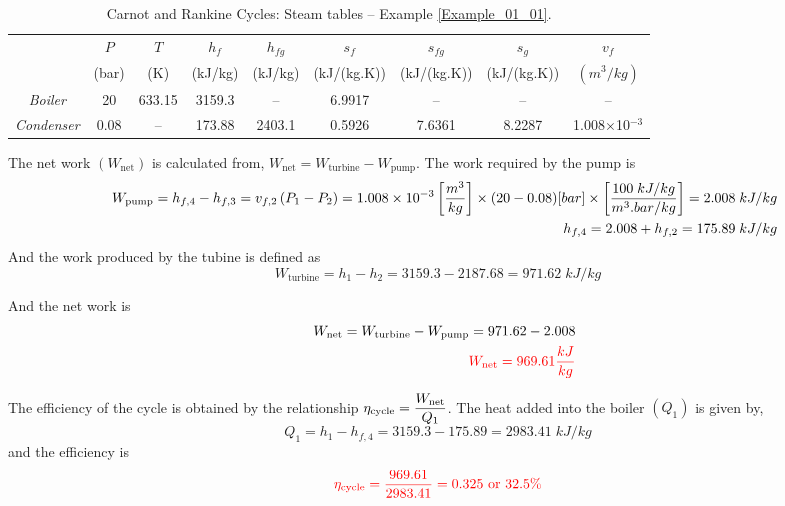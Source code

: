 \begin{enumerate}
\begin{center}
\begin{table}[h]
\begin{tabular}{c c c c c c c c c }
\hline
                    & $P$   & $T$ &  $h_{f}$  & $h_{fg}$ & $s_{f}$      & $s_{fg}$      & $s_{g}$        &   $v_{f}$ \\
                    & (bar) & (K) &  (kJ/kg) &  (kJ/kg) & (kJ/(kg.K)) & (kJ/(kg.K))   & (kJ/(kg.K))   &$\left(m^{3}/kg\right)$ \\
\hline
{\it Boiler}        & 20    & 633.15& 3159.3  & --      & 6.9917      & --            & --             & --  \\
\hline
{\it Condenser}     & 0.08  &  --  & 173.88  & 2403.1   & 0.5926      &  7.6361       & 8.2287         & 1.008$\times$10$^{-3}$ \\
\hline
\end{tabular}
\caption{Carnot and Rankine Cycles: Steam tables -- Example \ref{Example_01_01}.}
\label{Example01_01:Table1}
\end{table}
\end{center}

The net work $\left(W_{\text{net}}\right)$ is calculated from, $W_{\text{net}}=W_{\text{turbine}}-W_{\text{pump}}$. The work required by the pump is
\begin{eqnarray}
&& W_{\text{pump}}=h_{f,4}-h_{f,3}=v_{f,2}\left(P_{1}-P_{2}\right) = 1.008\times 10^{-3} \left[\displaystyle\frac{m^{3}}{kg}\right] \times (20-0.08) [bar] \times \left[\displaystyle\frac{100\;kJ/kg}{m^{3}.bar/kg}\right] = 2.008\; kJ/kg \nonumber \\
&& h_{f,4} = 2.008+h_{f,2}=175.89\;kJ/kg\nonumber
\end{eqnarray}
And the work produced by the tubine is defined as
\begin{displaymath}
W_{\text{turbine}}=h_{1}-h_{2} = 3159.3-2187.68= 971.62 \; kJ/kg
\end{displaymath}

And the net work is
\begin{eqnarray}
&& W_{\text{net}}=W_{\text{turbine}}-W_{\text{pump}} = 971.62-2.008 \nonumber \\
&& \textcolor{red}{W_{\text{net}}=969.61\displaystyle\frac{kJ}{kg}} \nonumber
\end{eqnarray}

The efficiency of the cycle is obtained by the relationship $\eta_{\text{cycle}}=\displaystyle\frac{W_{\text{net}}}{Q_{1}}$. The heat added into the boiler $\left(Q_{1}\right)$ is given by,
\begin{displaymath}
Q_{1}=h_{1}-h_{f,4}=3159.3-175.89=2983.41\;kJ/kg
\end{displaymath}
and the efficiency is
\begin{displaymath}
\textcolor{red}{\eta_{\text{cycle}}=\displaystyle\frac{969.61}{2983.41}=0.325\text{ or } 32.5\%}
\end{displaymath}



\end{enumerate}
